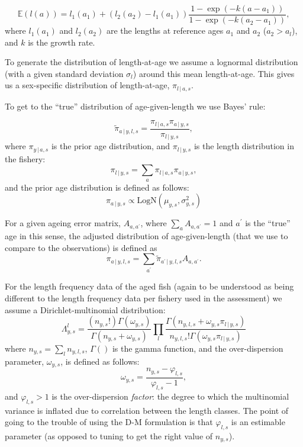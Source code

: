 \documentclass[12pt,a4paper,twoside,times,blue,standard]{csiroreport2017}
\newcommand{\ds}{\displaystyle}
\newcommand{\ap}{a^\prime}
\newcommand{\vphi}{\varphi}
\begin{document}
\begin{equation*}
    \ds \mathbb{E}\left(l(a)\right) = l_1(a_1)+(l_2(a_2)-l_1(a_1))\frac{1-\exp\left(-k\left(a-a_1\right)\right)}{1-\exp\left(-k\left(a_2-a_1\right)\right)},
\end{equation*}
where $l_1(a_1)$ and $l_2(a_2)$ are the lengths at reference ages $a_1$ and $a_2$ ($a_2>a_l$), and $k$ is the growth rate. 

To generate the distribution of length-at-age we assume a lognormal distribution (with a given standard deviation $\sigma_l$) around this mean length-at-age. This gives us a sex-specific distribution of length-at-age, $\pi_{l\,|\,a,s}$.

To get to the ``true'' distribution of age-given-length we use Bayes' rule:

\begin{equation*}
    \ds \tilde{\pi}_{a\,|\,y,l,s} = \frac{\pi_{l\,|\,a,s}\pi_{a\,|\,y,s}}{\pi_{l\,|\,y,s}},
\end{equation*}
where $\pi_{y\,|\,a,s}$ is the prior age distribution, and $\pi_{l\,|\,y,s}$ is the length distribution in the fishery:
\begin{equation*}
    \ds \pi_{l\,|\,y,s} = \sum_a \pi_{l\,|\,a,s}\pi_{a\,|\,y,s},
\end{equation*}
and the prior age distribution is defined as follows:
\begin{equation*}
    \ds \pi_{a\,|\,y,s} \propto \mathrm{LogN}\left(\mu_{y,s},\sigma^2_{y,s}\right)
\end{equation*}

For a given ageing error matrix, $A_{a,\ap}$, where $\sum_a A_{a,\ap}=1$ and $\ap$ is the ``true'' age in this sense, the adjusted distribution of age-given-length (that we use to compare to the observations) is defined as
\begin{equation*}
    \ds \pi_{a\,|\,y,l,s} = \sum_{\ap} \tilde{\pi}_{\ap\,|\,y,l,s} A_{a,\ap}.
\end{equation*}

For the length frequency data of the aged fish (again to be understood as being different to the length frequency data per fishery used in the assessment) we assume a Dirichlet-multinomial distribution:
\begin{equation*}
    \ds \Lambda^l_{y,s} = \frac{(n_{y,s}!)\Gamma(\omega_{y,s})}{\Gamma(n_{y,s}+\omega_{y,s})}\prod_l\frac{\Gamma(n_{y,l,s}+\omega_{y,s}\pi_{l\,|\,y,s})}{n_{y,l,s}!\Gamma(\omega_{y,s}\pi_{l\,|\,y,s})}
\end{equation*}
where $n_{y,s}=\sum_l n_{y,l,s}$, $\Gamma()$ is the gamma function, and the over-dispersion parameter, $\omega_{y,s}$, is defined as follows:
\begin{equation*}
    \ds \omega_{y,s} = \frac{n_{y,s}-\vphi_{l,s}}{\vphi_{l,s}-1},
\end{equation*}
and $\vphi_{l,s}>1$ is the over-dispersion \emph{factor}: the degree to which the multinomial variance is inflated due to correlation between the length classes. The point of going to the trouble of using the D-M formulation is that $\vphi_{l,s}$ is an estimable parameter (as opposed to tuning to get the right value of $n_{y,s}$).
\end{document}
